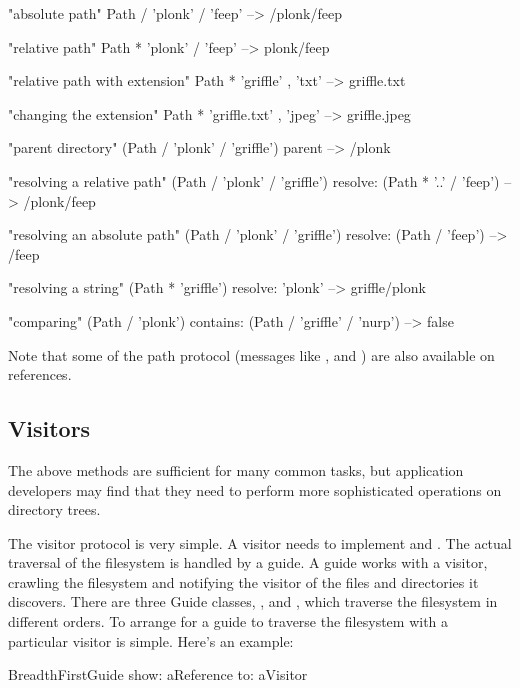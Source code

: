\documentclass[a4paper,10pt,twoside]{book}
\begin{document}
\begin{code}{}
"absolute path"
Path / 'plonk' / 'feep'       --> /plonk/feep
    
"relative path"
Path * 'plonk' / 'feep'       --> plonk/feep

"relative path with extension"
Path * 'griffle' , 'txt'      --> griffle.txt
    
"changing the extension"
Path * 'griffle.txt' , 'jpeg'     --> griffle.jpeg
    
"parent directory"
(Path / 'plonk' / 'griffle') parent   --> /plonk
    
"resolving a relative path"
(Path / 'plonk' / 'griffle') resolve: (Path * '..' / 'feep')
                   --> /plonk/feep
    
"resolving an absolute path"
(Path / 'plonk' / 'griffle') resolve: (Path / 'feep')
                   --> /feep
                                           
"resolving a string"
(Path * 'griffle') resolve: 'plonk'   --> griffle/plonk
                        
"comparing"
(Path / 'plonk') contains: (Path / 'griffle' / 'nurp')
                     --> false
\end{code}

Note that some of the path protocol (messages like \ct{/},  and ) are also available on references.

\subsection{Visitors}

The above methods are sufficient for many common tasks, but application developers may find that they need to perform more sophisticated operations on directory trees.

The visitor protocol is very simple. A visitor needs to implement  and . The actual traversal of the filesystem is handled by a guide. A guide works with a visitor, crawling the filesystem and notifying the visitor of the files and directories it discovers. There are three Guide classes, ,  and  , which traverse the filesystem in different orders. To arrange for a guide to traverse the filesystem with a particular visitor is simple. Here's an example:

\begin{code}{}
    BreadthFirstGuide show: aReference to: aVisitor
\end{code}	
\end{document}
